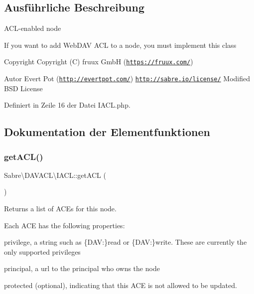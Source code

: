 \subsection{Ausführliche Beschreibung}
A\+C\+L-\/enabled node

If you want to add Web\+D\+AV A\+CL to a node, you must implement this class

\begin{DoxyCopyright}{Copyright}
Copyright (C) fruux GmbH (\href{https://fruux.com/}{\tt https\+://fruux.\+com/}) 
\end{DoxyCopyright}
\begin{DoxyAuthor}{Autor}
Evert Pot (\href{http://evertpot.com/}{\tt http\+://evertpot.\+com/})  \href{http://sabre.io/license/}{\tt http\+://sabre.\+io/license/} Modified B\+SD License 
\end{DoxyAuthor}


Definiert in Zeile 16 der Datei I\+A\+C\+L.\+php.



\subsection{Dokumentation der Elementfunktionen}
\mbox{\label{interface_sabre_1_1_d_a_v_a_c_l_1_1_i_a_c_l_a8fe3b3a5b48eae789d7eb722b340045c}} 
\subsubsection{\texorpdfstring{get\+A\+C\+L()}{getACL()}}
{\footnotesize\ttfamily Sabre\textbackslash{}\+D\+A\+V\+A\+C\+L\textbackslash{}\+I\+A\+C\+L\+::get\+A\+CL (\begin{DoxyParamCaption}{ }\end{DoxyParamCaption})}

Returns a list of A\+CE\textquotesingle{}s for this node.

Each A\+CE has the following properties\+:
\begin{DoxyItemize}
\item \textquotesingle{}privilege\textquotesingle{}, a string such as \{D\+AV\+:\}read or \{D\+AV\+:\}write. These are currently the only supported privileges
\item \textquotesingle{}principal\textquotesingle{}, a url to the principal who owns the node
\item \textquotesingle{}protected\textquotesingle{} (optional), indicating that this A\+CE is not allowed to be updated.
\end{DoxyItemize}

